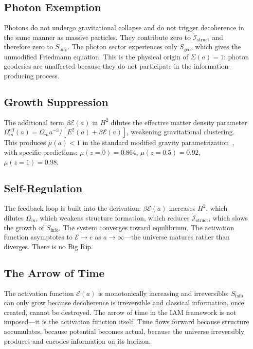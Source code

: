 \documentclass[aps,prd,twocolumn,superscriptaddress,nofootinbib]{revtex4-2}
\begin{document}
\subsection{Photon Exemption}

Photons do not undergo gravitational collapse and do not trigger decoherence in the same manner as massive particles. They contribute zero to $\dot{\mathcal{I}}_\text{struct}$ and therefore zero to $S_\text{info}$. The photon sector experiences only $S_\text{geo}$, which gives the unmodified Friedmann equation. This is the physical origin of $\Sigma(a) = 1$: photon geodesics are unaffected because they do not participate in the information-producing process.

\subsection{Growth Suppression}

The additional term $\beta\mathcal{E}(a)$ in $H^2$ dilutes the effective matter density parameter $\Omega_m^\text{eff}(a) = \Omega_m a^{-3}/[E^2(a) + \beta\mathcal{E}(a)]$, weakening gravitational clustering. This produces $\mu(a) < 1$ in the standard modified gravity parametrization~\cite{Zhao2009,Hojjati2011}, with specific predictions: $\mu(z=0) = 0.864$, $\mu(z=0.5) = 0.92$, $\mu(z=1) = 0.98$.

\subsection{Self-Regulation}

The feedback loop is built into the derivation: $\beta\mathcal{E}(a)$ increases $H^2$, which dilutes $\Omega_m$, which weakens structure formation, which reduces $\dot{\mathcal{I}}_\text{struct}$, which slows the growth of $S_\text{info}$. The system converges toward equilibrium. The activation function asymptotes to $\mathcal{E} \to e$ as $a \to \infty$---the universe matures rather than diverges. There is no Big Rip.

\subsection{The Arrow of Time}

The activation function $\mathcal{E}(a)$ is monotonically increasing and irreversible: $S_\text{info}$ can only grow because decoherence is irreversible and classical information, once created, cannot be destroyed. The arrow of time in the IAM framework is not imposed---it is the activation function itself. Time flows forward because structure accumulates, because potential becomes actual, because the universe irreversibly produces and encodes information on its horizon.
\end{document}
